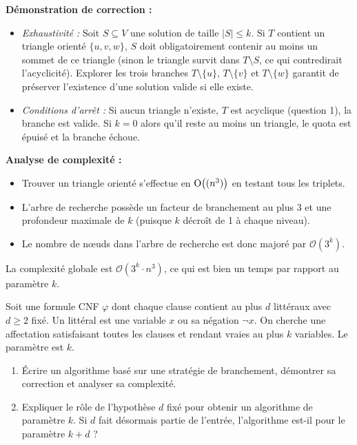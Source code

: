 \begin{td-sol}
\begin{enumerate}
        \textbf{Démonstration de correction :}
        \begin{itemize}
            \item \textit{Exhaustivité :} Soit \(S \subseteq V\) une solution de taille \(|S| \le k\). Si \(T\) contient un triangle orienté \(\{u, v, w\}\), \(S\) doit obligatoirement contenir au moins un sommet de ce triangle (sinon le triangle survit dans \(T \setminus S\), ce qui contredirait l'acyclicité). Explorer les trois branches \(T \setminus \{u\}\), \(T \setminus \{v\}\) et \(T \setminus \{w\}\) garantit de préserver l'existence d'une solution valide si elle existe.
            \item \textit{Conditions d'arrêt :} Si aucun triangle n'existe, \(T\) est acyclique (question 1), la branche est valide. Si \(k=0\) alors qu'il reste au moins un triangle, le quota est épuisé et la branche échoue.
        \end{itemize}

        \textbf{Analyse de complexité :}
        \begin{itemize}
            \item Trouver un triangle orienté s'effectue en \(\BigO{(n^3)}\) en testant tous les triplets.
            \item L'arbre de recherche possède un facteur de branchement au plus \(3\) et une profondeur maximale de \(k\) (puisque \(k\) décroît de 1 à chaque niveau).
            \item Le nombre de nœuds dans l'arbre de recherche est donc majoré par \(\mathcal{O}(3^k)\).
        \end{itemize}
        La complexité globale est \(\mathcal{O}(3^k \cdot n^3)\), ce qui est bien un temps  par rapport au paramètre \(k\).
    \end{enumerate}
\end{td-sol}


\begin{td-exo}
    Soit une formule CNF \(\varphi\) dont chaque clause contient au plus \(d\) littéraux avec \(d\geq 2\) fixé.
    Un littéral est une variable \(x\) ou sa négation \(\lnot x\).
    On cherche une affectation satisfaisant toutes les clauses et rendant vraies au plus \(k\) variables.
    Le paramètre est \(k\).

    \begin{enumerate}
        \item Écrire un algorithme basé sur une stratégie de branchement, démontrer sa correction et analyser sa complexité.

        \item Expliquer le rôle de l'hypothèse \og{}\(d\) fixé\fg{} pour obtenir un algorithme  de paramètre \(k\).
        Si \(d\) fait désormais partie de l'entrée, l'algorithme est-il  pour le paramètre \(k+d\) ?
    \end{enumerate}
\end{td-exo}
